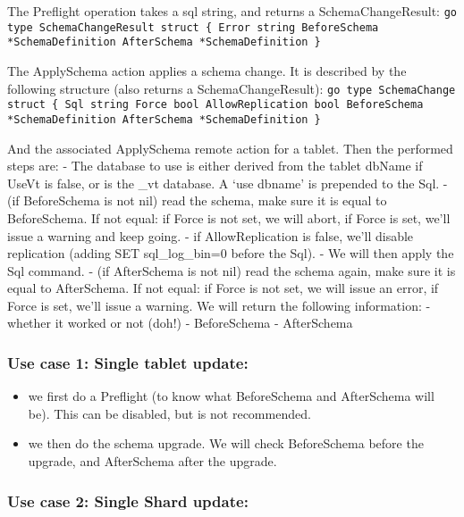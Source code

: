 The Preflight operation takes a sql string, and returns a SchemaChangeResult:
{\tt go
type SchemaChangeResult struct \{
 Error        string
 BeforeSchema *SchemaDefinition
 AfterSchema  *SchemaDefinition
\}
}

The ApplySchema action applies a schema change. It is described by the following structure (also returns a SchemaChangeResult):
{\tt go
type SchemaChange struct \{
 Sql              string
 Force            bool
 AllowReplication bool
 BeforeSchema     *SchemaDefinition
 AfterSchema      *SchemaDefinition
\}
}

And the associated ApplySchema remote action for a tablet. Then the performed steps are:
- The database to use is either derived from the tablet dbName if UseVt is false, or is the \_vt database. A ‘use dbname’ is prepended to the Sql.
- (if BeforeSchema is not nil) read the schema, make sure it is equal to BeforeSchema. If not equal: if Force is not set, we will abort, if Force is set, we’ll issue a warning and keep going.
- if AllowReplication is false, we’ll disable replication (adding SET sql\_log\_bin=0 before the Sql).
- We will then apply the Sql command.
- (if AfterSchema is not nil) read the schema again, make sure it is equal to AfterSchema. If not equal: if Force is not set, we will issue an error, if Force is set, we’ll issue a warning.
We will return the following information:
- whether it worked or not (doh!)
- BeforeSchema
- AfterSchema

\subsubsection{Use case 1: Single tablet update:}\hypertarget{use-case-1-single-tablet-update}{}\label{use-case-1-single-tablet-update}

\begin{itemize}
\item we first do a Preflight (to know what BeforeSchema and AfterSchema will be). This can be disabled, but is not recommended.
\item we then do the schema upgrade. We will check BeforeSchema before the upgrade, and AfterSchema after the upgrade.
\end{itemize}

\subsubsection{Use case 2: Single Shard update:}\hypertarget{use-case-2-single-shard-update}{}\label{use-case-2-single-shard-update}

